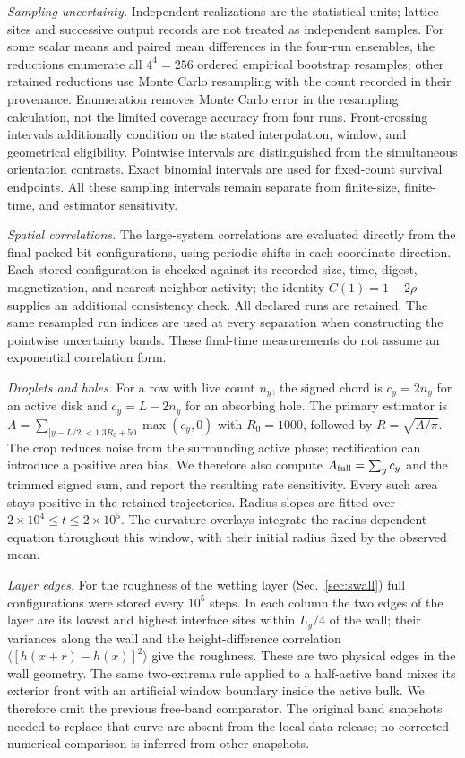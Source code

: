 \textit{Sampling uncertainty.} Independent realizations are the statistical
units; lattice sites and successive output records are not treated as
independent samples. For some scalar means and paired mean differences in the
four-run ensembles, the reductions enumerate all $4^4=256$ ordered
empirical bootstrap resamples; other retained reductions use Monte Carlo
resampling with the count recorded in their provenance. Enumeration removes Monte Carlo error in the
resampling calculation, not the limited coverage accuracy from four runs.
Front-crossing intervals additionally condition on the stated interpolation,
window, and geometrical eligibility. Pointwise intervals are distinguished
from the simultaneous orientation contrasts. Exact binomial intervals are
used for fixed-count survival endpoints. All these sampling intervals remain
separate from finite-size, finite-time, and estimator sensitivity.

\textit{Spatial correlations.} The large-system correlations are evaluated
directly from the final packed-bit configurations, using periodic shifts in
each coordinate direction. Each stored configuration is checked against its
recorded size, time, digest, magnetization, and nearest-neighbor activity;
the identity $C(1)=1-2\rho$ supplies an additional consistency check.
All declared runs are retained. The same resampled run indices are used at
every separation when constructing the pointwise uncertainty bands.
These final-time measurements do not assume an exponential correlation form.

\textit{Droplets and holes.} For a row with live count $n_y$, the signed chord is $c_y=2n_y$ for an
active disk and $c_y=L-2n_y$ for an absorbing hole. The primary estimator is
$A=\sum_{|y-L/2|<1.3R_0+50}\max(c_y,0)$ with $R_0=1000$, followed by
$R=\sqrt{A/\pi}$. The crop reduces noise from the surrounding active phase;
rectification can introduce a positive area bias. We therefore also compute
$A_{\rm full}=\sum_y c_y$ and the trimmed signed sum, and report the resulting
rate sensitivity. Every such area stays positive in the retained trajectories.
Radius slopes are fitted over $2\times10^4\le t\le2\times10^5$.
The curvature overlays integrate the radius-dependent equation throughout
this window, with their initial radius fixed by the observed mean.


\textit{Layer edges.} For the roughness of the wetting layer (Sec.~\ref{sec:swall}) full
configurations were stored every $10^5$ steps. In each column the two edges of the layer are its
lowest and highest interface sites within $L_y/4$ of the wall; their variances along the wall and
the height-difference correlation $\langle[h(x+r)-h(x)]^2\rangle$ give the roughness.
These are two physical edges in the wall geometry. The same two-extrema
rule applied to a half-active band mixes its exterior front with an artificial
window boundary inside the active bulk. We therefore omit the previous
free-band comparator. The original band snapshots needed to replace that
curve are absent from the local data release; no corrected numerical
comparison is inferred from other snapshots.

